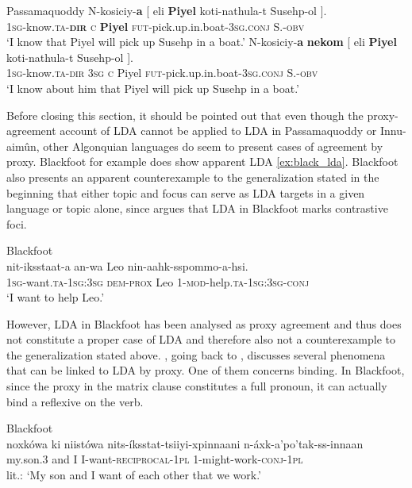 \documentclass[output=paper
,modfonts
,nonflat]{langsci/langscibook}
\begin{document}
\begin{exe}
\ex Passamaquoddy \citep[][270]{Bruening2001a} \label{ex:passam_pro}
	\xlist
	\ex 
		\gll N-kosiciy-\textbf{a} [ eli \textbf{Piyel} koti-nathula-t Susehp-ol ].\\
			 \textsc{1sg}-know.\textsc{ta}-\textbf{\textsc{dir}} {} \textsc{c} \textbf{Piyel} \textsc{fut}-pick.up.in.boat-\textsc{3sg.conj} S.-\textsc{obv}\\
		\glt `I know that Piyel will pick up Susehp in a boat.'
	\ex
	 	\gll *N-kosiciy-\textbf{a} \textbf{nekom} [ eli \textbf{Piyel} koti-nathula-t Susehp-ol ].\\
			 \textsc{1sg}-know.\textsc{ta}-\textsc{dir} \textsc{3sg} {} \textsc{c} Piyel \textsc{fut}-pick.up.in.boat-3\textsc{sg.conj} S.-\textsc{obv}\\
		\glt `I know about him that Piyel will pick up Susehp in a boat.'
	\endxlist
\end{exe}
Before closing this section, it should be pointed out that even though the proxy-agreement account of LDA cannot be applied to LDA in Passamaquoddy or Innu-aim\^{u}n, other Algonquian languages do seem to present cases of agreement by proxy. Blackfoot for example does show apparent LDA \ref{ex:black_lda}. Blackfoot also presents an apparent counterexample to the generalization stated in the beginning that either topic and focus can serve as LDA targets in a given language or topic alone, since \citet{Bliss2009} argues that LDA in Blackfoot marks contrastive foci.
\begin{exe}
\ex Blackfoot \citep[][1]{Bliss2009}\label{ex:black_lda}\\
	\gll nit-iksstaat-a an-wa Leo nin-aahk-sspommo-a-hsi.\\
		 \textsc{1sg}-want.\textsc{ta}-\textsc{1sg:3sg} \textsc{dem-prox} Leo 1-\textsc{mod}-help.\textsc{ta-1sg:3sg-conj}\\
	\glt `I want to help Leo.'
\end{exe}
However, LDA in Blackfoot has been analysed as proxy agreement and thus does not constitute a proper case of LDA and therefore also not a counterexample to the generalization stated above. \citet{Polinsky2003}, going back to \citet{Frantz1978}, discusses several phenomena that can be linked to LDA by proxy. One of them concerns binding. In Blackfoot, since the proxy in the matrix clause constitutes a full pronoun, it can actually bind a reflexive on the verb.
\begin{exe}
\ex Blackfoot \citep[][99, via Polinsky 2003: 286]{Frantz1978}\\
	\gll noxk\'{o}wa ki niist\'{o}wa nits-\'{i}ksstat-tsiiyi-xpinnaani n-\'{a}xk-a'po'tak-ss-innaan\\
		 my.son.3 and I I-want-\textsc{reciprocal}-1\textsc{pl} 1-might-work-\textsc{conj-1pl}\\
	\glt lit.: `My son and I want of each other that we work.'
\end{exe}
\end{document}

